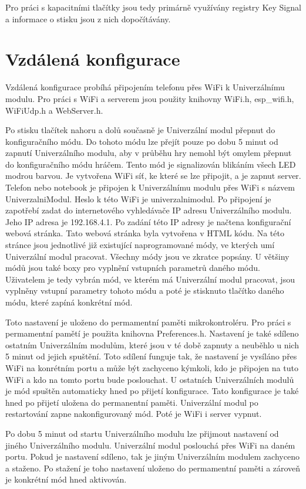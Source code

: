 Pro práci s kapacitními tlačítky jsou tedy primárně využívány registry Key Signal a informace o stisku jsou z nich dopočítávány. 

\section{Vzdálená konfigurace}
Vzdálená konfigurace probíhá připojením telefonu přes WiFi k Univerzálnímu modulu. Pro práci s WiFi a serverem jsou použity knihovny WiFi.h, esp\_wifi.h, WiFiUdp.h a WebServer.h. 

Po stisku tlačítek nahoru a dolů současně je Univerzální modul přepnut do konfiguračního módu. Do tohoto módu lze přejít pouze po dobu 5 minut od zapnutí Univerzálního modulu, aby v průběhu hry nemohl 
být omylem přepnut do konfiguračního módu hráčem. Tento mód je signalizován blikáním všech LED modrou barvou. Je vytvořena WiFi síť, ke které se lze připojit, a je zapnut server. Telefon nebo notebook je připojen 
k Univerzálnímu modulu přes WiFi s názvem UniverzalniModul. Heslo k této WiFi je univerzalnimodul. Po připojení je zapotřebí zadat do internetového vyhledávače IP adresu Univerzálního modulu. Jeho IP adresa 
je 192.168.4.1. Po zadání této IP adresy je načtena konfigurační webová stránka. Tato webová stránka byla vytvořena v HTML kódu. Na této stránce jsou jednotlivé již existující naprogramované módy, ve kterých umí 
Univerzální modul pracovat. Všechny módy jsou ve zkratce popsány. U většiny módů jsou také boxy pro vyplnění vstupních parametrů daného módu. Uživatelem je tedy vybrán mód, ve kterém má Univerzální modul pracovat, 
jsou vyplněny vstupní parametry tohoto módu a poté je stisknuto tlačítko daného módu, které zapíná konkrétní mód. 

Toto nastavení je uloženo do permamentní paměti mikrokontroléru. Pro práci s permamentní pamětí je použita knihovna Preferences.h. Nastavení je také sdíleno ostatním Univerzálním modulům, které jsou v té době zapnuty 
a neuběhlo u nich 5 minut od jejich spuštění. Toto sdílení funguje tak, že nastavení je vysíláno přes WiFi na konrétním portu a může být zachyceno kýmkoli, kdo je připojen na tuto WiFi a kdo na tomto portu bude 
poslouchat. U ostatních Univerzálních modulů je mód spuštěn automaticky hned po přijetí konfigurace. Tato konfigurace je také hned po přijetí uložena do permanentní paměti. Univerzální modul po restartování zapne 
nakonfigurovaný mód. Poté je WiFi i server vypnut. 

Po dobu 5 minut od startu Univerzálního modulu lze přijmout nastavení od jiného Univerzálního modulu. Univerzální modul poslouchá přes WiFi na daném portu. Pokud je nastavení sdíleno, tak je jiným Univerzálním modulem 
zachyceno a staženo. Po stažení je toho nastavení uloženo do permamentní paměti a zároveň je konkrétní mód hned aktivován. 


